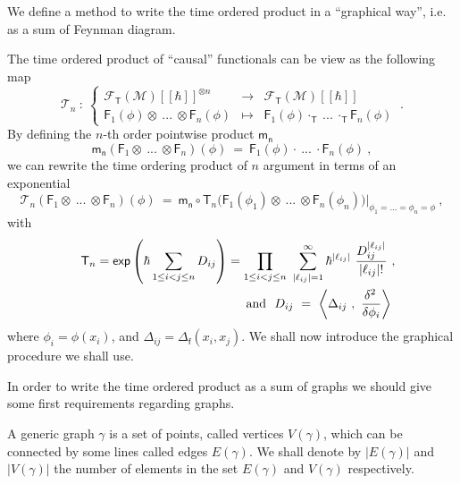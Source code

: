 \documentclass[11pt]{book}
\renewcommand{\exp}{\mathsf{exp}}
\newcommand{\abs}[1]{\left|#1\right|}
\newcommand{\sm}[1]{\left\langle#1\right\rangle}
\newcommand{\Fcal}{\mathcal{F}}
\newcommand{\Mcal}{\mathcal{M}}
\newcommand{\Tcal}{\mathcal{T}}
\newcommand{\Fsf}{\mathsf{F}}
\newcommand{\Tsf}{\mathsf{T}}
\newcommand{\fsf}{\mathsf{f}}
\newcommand{\msf}{\mathsf{m}}
\newcommand{\nsf}{\mathsf{n}}
\theoremstyle{break}
\begin{document}
We define a method to write the time ordered product in a ``graphical way'', i.e. as a sum of Feynman diagram. 


\bigskip


The  time ordered product of ``causal'' functionals can be view as the following map
%
\begin{equation}
\Tcal_n \ : \ 
\left\{
\begin{array}{lcl}
\Fcal_\Tsf(\Mcal)[[\hbar]]^{\otimes n} & \to & \Fcal_\Tsf(\Mcal)[[\hbar]] \\
\Fsf_1(\phi) \otimes \ ... \ \otimes \Fsf_n(\phi) & \mapsto & \Fsf_1(\phi) \cdot_{\Tsf} \ ... \ \cdot_{\Tsf} \Fsf_n(\phi)
\end{array}
\right. \ .
\label{eq:time_ordered_op}
\end{equation}
% 
By defining the $n$-th order pointwise product $\msf_\nsf$
%
\begin{equation*}
\msf_\nsf \left( \Fsf_1 \otimes \ ... \ \otimes \Fsf_n \right)(\phi) \ = \ \Fsf_1(\phi) \cdot \ ... \ \cdot \Fsf_n(\phi) \ ,
\end{equation*}
%
we can rewrite the time ordering product of $n$ argument in terms of an exponential
%
\begin{equation*}
\Tcal_n (\Fsf_1 \otimes \ ... \ \otimes \Fsf_n)(\phi) \ = \ \msf_\nsf \circ \Tsf_n \bigg( \Fsf_1(\phi_1) \otimes \ ... \ \otimes \Fsf_n(\phi_n) \bigg) \bigg|_{\phi_1 = ... = \phi_n = \phi} \ ,
\end{equation*}
%
with 
%
\begin{eqnarray*}
&&\Tsf_n = \exp\left(\hbar \sum_{1 \leq i < j \leq n} D_{ij}\right) =
\prod_{1 \leq i < j \leq n} \ \sum_{\abs{\ell_{ij}}=1}^\infty \hbar^{\abs{\ell_{ij}}} \ \frac{D_{ij}^{\abs{\ell_{ij}}}}{\abs{\ell_{ij}} !} \ , \\
&& \mbox{ and } \ D_{ij} \ = \ \sm{\Delta_{ij} \ , \ \frac{\delta^2 \hfil}{\delta \phi_i} } \ 
\end{eqnarray*}
%
where $\phi_i = \phi(x_i)$, and $\Delta_{ij}=\Delta_\fsf(x_i,x_j)$. We shall now introduce the graphical procedure we shall use. 


\bigskip

In order to write the time ordered product as a sum of graphs we should give some first requirements regarding graphs.


A generic graph $\gamma$ is a set of points, called vertices $V(\gamma)$, which can be connected by some lines called edges $E(\gamma)$. We shall denote by $\abs{E(\gamma)}$ and $\abs{V(\gamma)}$ the number of elements in the set $E(\gamma)$ and $V(\gamma)$ respectively. 
\end{document}
